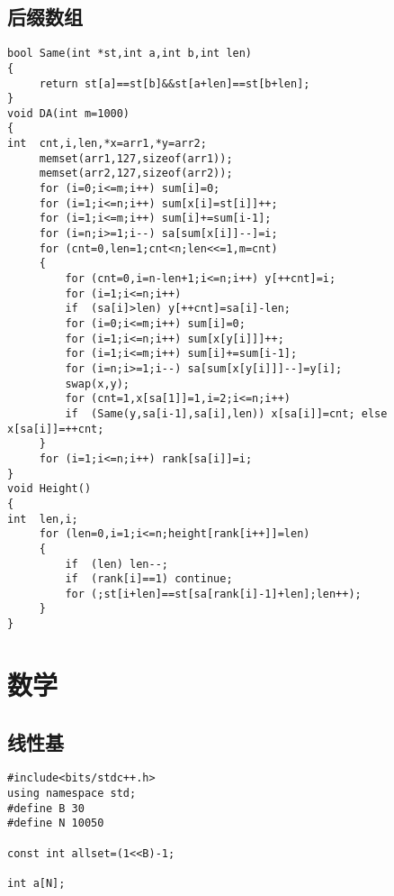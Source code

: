 \documentclass{article}
\begin{document}
\begin{CJK*}{UTF8}{song}
\subsection{后缀数组}
\begin{lstlisting}
bool Same(int *st,int a,int b,int len)
{
     return st[a]==st[b]&&st[a+len]==st[b+len];
}
void DA(int m=1000)
{
int  cnt,i,len,*x=arr1,*y=arr2;
     memset(arr1,127,sizeof(arr1));
     memset(arr2,127,sizeof(arr2));
     for (i=0;i<=m;i++) sum[i]=0;
     for (i=1;i<=n;i++) sum[x[i]=st[i]]++;
     for (i=1;i<=m;i++) sum[i]+=sum[i-1];
     for (i=n;i>=1;i--) sa[sum[x[i]]--]=i;
     for (cnt=0,len=1;cnt<n;len<<=1,m=cnt)
     {
         for (cnt=0,i=n-len+1;i<=n;i++) y[++cnt]=i;
         for (i=1;i<=n;i++)
         if  (sa[i]>len) y[++cnt]=sa[i]-len;
         for (i=0;i<=m;i++) sum[i]=0;
         for (i=1;i<=n;i++) sum[x[y[i]]]++;
         for (i=1;i<=m;i++) sum[i]+=sum[i-1];
         for (i=n;i>=1;i--) sa[sum[x[y[i]]]--]=y[i];
         swap(x,y);
         for (cnt=1,x[sa[1]]=1,i=2;i<=n;i++)
         if  (Same(y,sa[i-1],sa[i],len)) x[sa[i]]=cnt; else x[sa[i]]=++cnt;
     }
     for (i=1;i<=n;i++) rank[sa[i]]=i;
}
void Height()
{
int  len,i;
     for (len=0,i=1;i<=n;height[rank[i++]]=len)
     {
         if  (len) len--;
         if  (rank[i]==1) continue;
         for (;st[i+len]==st[sa[rank[i]-1]+len];len++);
     }
}
\end{lstlisting}
\section{数学}
\subsection{线性基}
\begin{lstlisting}
#include<bits/stdc++.h>
using namespace std;
#define B 30
#define N 10050

const int allset=(1<<B)-1;

int a[N];


\end{lstlisting}
\end{CJK*}
\end{document}
